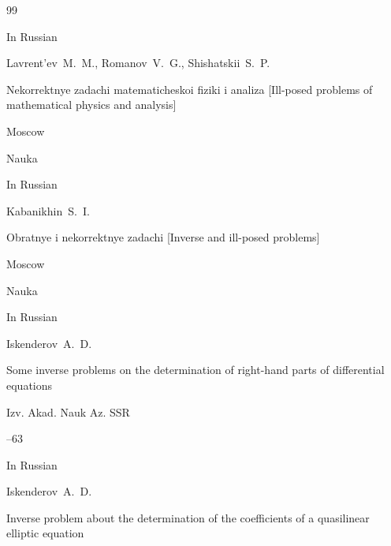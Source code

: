 \begin{thebibliography}{99}








\lang In Russian

\by Lavrent'ev~M.~M., Romanov~V.~G., Shishatskii~S.~P.

\book Nekorrektnye zadachi matematicheskoi fiziki i analiza \rm [Ill-posed problems of mathematical physics and analysis]

\publaddr Moscow

\publ Nauka 








\lang In Russian

\by Kabanikhin~S.~I.

\book Obratnye i nekorrektnye zadachi \rm [Inverse and ill-posed problems]

\publaddr Moscow

\publ Nauka 












\lang In Russian

\by Iskenderov~A.~D.

\paper Some inverse problems on the determination of right-hand parts of differential equations

\jour Izv. Akad. Nauk Az. SSR



--63 







\lang In Russian

\by Iskenderov~A.~D.

\paper Inverse problem about the determination of the coefficients of a quasilinear elliptic equation


\end{thebibliography}

